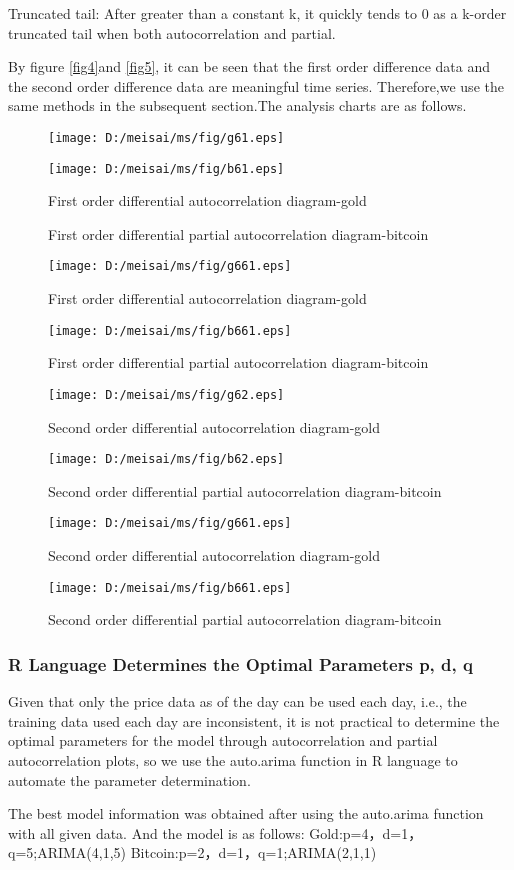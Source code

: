 \documentclass{mcmthesis}
\begin{document}
Truncated tail: After greater than a constant k, it quickly tends to 0 as a k-order truncated tail when both autocorrelation and partial.

By figure \ref{fig4}and \ref{fig5}, it can be seen that the first order difference data and the second order difference data are meaningful time series.
Therefore,we use the same methods in the subsequent section.The analysis charts are as follows.

\begin{figure}[htbp]
  \centering
  \texttt{[image: D:/meisai/ms/fig/g61.eps]}
  \caption{First order differential autocorrelation diagram-gold}
  \texttt{[image: D:/meisai/ms/fig/b61.eps]}
\end{figure}
\begin{figure}[htbp]
  \caption{First order differential partial autocorrelation diagram-bitcoin} 
  \texttt{[image: D:/meisai/ms/fig/g661.eps]}
  \caption{First order differential autocorrelation diagram-gold}
  \texttt{[image: D:/meisai/ms/fig/b661.eps]}
  \caption{First order differential partial autocorrelation diagram-bitcoin} 
\end{figure}

\begin{figure}[!h]
  \texttt{[image: D:/meisai/ms/fig/g62.eps]}
  \caption{Second order differential autocorrelation diagram-gold}
  \texttt{[image: D:/meisai/ms/fig/b62.eps]}
  \caption{Second order differential partial autocorrelation diagram-bitcoin} 
  \texttt{[image: D:/meisai/ms/fig/g661.eps]}
  \caption{Second order differential autocorrelation diagram-gold}
  \texttt{[image: D:/meisai/ms/fig/b661.eps]}
  \caption{Second order differential partial autocorrelation diagram-bitcoin} 
  \label{fig661}
\end{figure}


\subsubsection{R Language Determines the Optimal Parameters p, d, q}
Given that only the price data as of the day can be used each day, i.e., 
the training data used each day are inconsistent,
it is not practical to determine the optimal parameters for the model through autocorrelation and partial autocorrelation plots, 
so we use the auto.arima function in R language to automate the parameter determination.

The best model information was obtained after using the auto.arima function with all given data.
And the model is as follows:
Gold:p=4，d=1，q=5;ARIMA(4,1,5)                          Bitcoin:p=2，d=1，q=1;ARIMA(2,1,1) 
\end{document}

